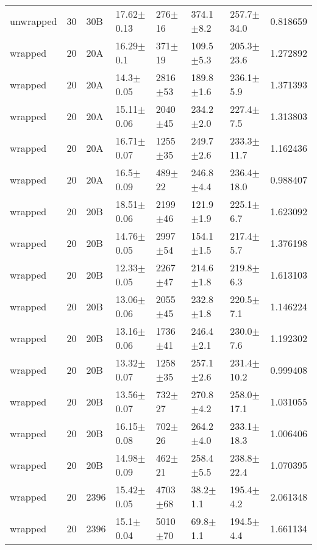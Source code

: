 \begin{tabular}{lrlllllr}
    unwrapped &      30 &     30B &   17.62$\pm$0.13 &   276$\pm$16 &   374.1$\pm$8.2 &  257.7$\pm$34.0 &    0.818659 \\
      wrapped &      20 &     20A &    16.29$\pm$0.1 &   371$\pm$19 &   109.5$\pm$5.3 &  205.3$\pm$23.6 &    1.272892 \\
      wrapped &      20 &     20A &    14.3$\pm$0.05 &  2816$\pm$53 &   189.8$\pm$1.6 &   236.1$\pm$5.9 &    1.371393 \\
      wrapped &      20 &     20A &   15.11$\pm$0.06 &  2040$\pm$45 &   234.2$\pm$2.0 &   227.4$\pm$7.5 &    1.313803 \\
      wrapped &      20 &     20A &   16.71$\pm$0.07 &  1255$\pm$35 &   249.7$\pm$2.6 &  233.3$\pm$11.7 &    1.162436 \\
      wrapped &      20 &     20A &    16.5$\pm$0.09 &   489$\pm$22 &   246.8$\pm$4.4 &  236.4$\pm$18.0 &    0.988407 \\
      wrapped &      20 &     20B &   18.51$\pm$0.06 &  2199$\pm$46 &   121.9$\pm$1.9 &   225.1$\pm$6.7 &    1.623092 \\
      wrapped &      20 &     20B &   14.76$\pm$0.05 &  2997$\pm$54 &   154.1$\pm$1.5 &   217.4$\pm$5.7 &    1.376198 \\
      wrapped &      20 &     20B &   12.33$\pm$0.05 &  2267$\pm$47 &   214.6$\pm$1.8 &   219.8$\pm$6.3 &    1.613103 \\
      wrapped &      20 &     20B &   13.06$\pm$0.06 &  2055$\pm$45 &   232.8$\pm$1.8 &   220.5$\pm$7.1 &    1.146224 \\
      wrapped &      20 &     20B &   13.16$\pm$0.06 &  1736$\pm$41 &   246.4$\pm$2.1 &   230.0$\pm$7.6 &    1.192302 \\
      wrapped &      20 &     20B &   13.32$\pm$0.07 &  1258$\pm$35 &   257.1$\pm$2.6 &  231.4$\pm$10.2 &    0.999408 \\
      wrapped &      20 &     20B &   13.56$\pm$0.07 &   732$\pm$27 &   270.8$\pm$4.2 &  258.0$\pm$17.1 &    1.031055 \\
      wrapped &      20 &     20B &   16.15$\pm$0.08 &   702$\pm$26 &   264.2$\pm$4.0 &  233.1$\pm$18.3 &    1.006406 \\
      wrapped &      20 &     20B &   14.98$\pm$0.09 &   462$\pm$21 &   258.4$\pm$5.5 &  238.8$\pm$22.4 &    1.070395 \\
      wrapped &      20 &    2396 &   15.42$\pm$0.05 &  4703$\pm$68 &    38.2$\pm$1.1 &   195.4$\pm$4.2 &    2.061348 \\
      wrapped &      20 &    2396 &    15.1$\pm$0.04 &  5010$\pm$70 &    69.8$\pm$1.1 &   194.5$\pm$4.4 &    1.661134 \\

\end{tabular}

